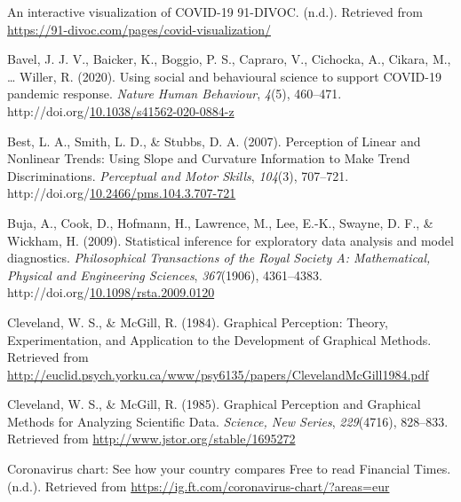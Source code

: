\documentclass[print]{nuthesis}
\newlength{\cslhangindent}
\newenvironment{CSLReferences}%
{\setlength{\parindent}{0pt}%
\everypar{\setlength{\hangindent}{\cslhangindent}}\ignorespaces}%
{\par}
\begin{document}
\hypertarget{refs}{}
\begin{CSLReferences}{1}{0}
\leavevmode\hypertarget{ref-noauthor_interactive_nodate}{}%
An interactive visualization of {COVID}-19 {{}} 91-{DIVOC}. (n.d.). Retrieved from \url{https://91-divoc.com/pages/covid-visualization/}

\leavevmode\hypertarget{ref-bavel_using_2020}{}%
Bavel, J. J. V., Baicker, K., Boggio, P. S., Capraro, V., Cichocka, A., Cikara, M., \ldots{} Willer, R. (2020). Using social and behavioural science to support {COVID}-19 pandemic response. \emph{Nature Human Behaviour}, \emph{4}(5), 460--471. http://doi.org/\href{https://doi.org/10.1038/s41562-020-0884-z}{10.1038/s41562-020-0884-z}

\leavevmode\hypertarget{ref-best_perception_2007}{}%
Best, L. A., Smith, L. D., \& Stubbs, D. A. (2007). Perception of {Linear} and {Nonlinear} {Trends}: {Using} {Slope} and {Curvature} {Information} to {Make} {Trend} {Discriminations}. \emph{Perceptual and Motor Skills}, \emph{104}(3), 707--721. http://doi.org/\href{https://doi.org/10.2466/pms.104.3.707-721}{10.2466/pms.104.3.707-721}

\leavevmode\hypertarget{ref-buja_statistical_2009}{}%
Buja, A., Cook, D., Hofmann, H., Lawrence, M., Lee, E.-K., Swayne, D. F., \& Wickham, H. (2009). Statistical inference for exploratory data analysis and model diagnostics. \emph{Philosophical Transactions of the Royal Society A: Mathematical, Physical and Engineering Sciences}, \emph{367}(1906), 4361--4383. http://doi.org/\href{https://doi.org/10.1098/rsta.2009.0120}{10.1098/rsta.2009.0120}

\leavevmode\hypertarget{ref-cleveland_graphical_1984}{}%
Cleveland, W. S., \& McGill, R. (1984). Graphical {Perception}: {Theory}, {Experimentation}, and {Application} to the {Development} of {Graphical} {Methods}. Retrieved from \url{http://euclid.psych.yorku.ca/www/psy6135/papers/ClevelandMcGill1984.pdf}

\leavevmode\hypertarget{ref-cleveland_graphical_1985}{}%
Cleveland, W. S., \& McGill, R. (1985). Graphical {Perception} and {Graphical} {Methods} for {Analyzing} {Scientific} {Data}. \emph{Science, New Series}, \emph{229}(4716), 828--833. Retrieved from \url{http://www.jstor.org/stable/1695272}

\leavevmode\hypertarget{ref-noauthor_coronavirus_nodate}{}%
Coronavirus chart: See how your country compares {{}} {Free} to read {{}} {Financial} {Times}. (n.d.). Retrieved from \url{https://ig.ft.com/coronavirus-chart/?areas=eur}


\end{CSLReferences}
\end{document}

